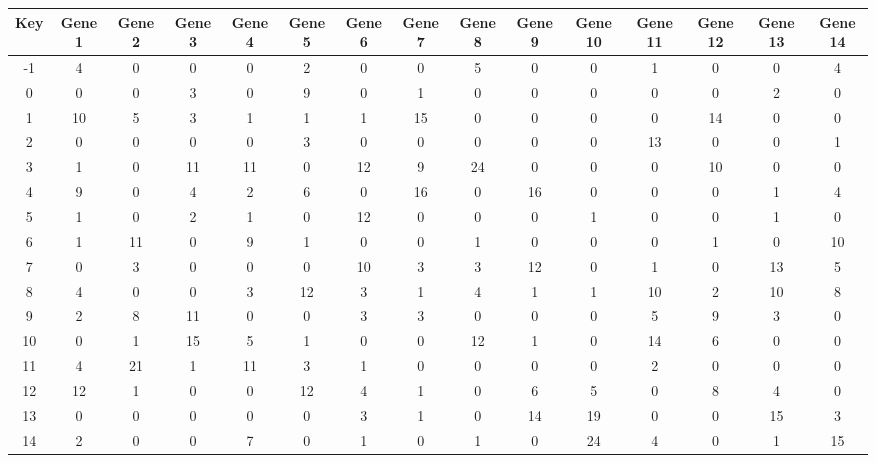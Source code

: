 \begin{tabular}{|c|c|c|c|c|c|c|c|c|c|c|c|c|c|c|}
\hline
Key & Gene 1 & Gene 2 & Gene 3 & Gene 4 & Gene 5 & Gene 6 & Gene 7 & Gene 8 & Gene 9 & Gene 10 & Gene 11 & Gene 12 & Gene 13 & Gene 14 \\
\hline
-1 & 4 & 0 & 0 & 0 & 2 & 0 & 0 & 5 & 0 & 0 & 1 & 0 & 0 & 4 \\
0 & 0 & 0 & 3 & 0 & 9 & 0 & 1 & 0 & 0 & 0 & 0 & 0 & 2 & 0 \\
1 & 10 & 5 & 3 & 1 & 1 & 1 & 15 & 0 & 0 & 0 & 0 & 14 & 0 & 0 \\
2 & 0 & 0 & 0 & 0 & 3 & 0 & 0 & 0 & 0 & 0 & 13 & 0 & 0 & 1 \\
3 & 1 & 0 & 11 & 11 & 0 & 12 & 9 & 24 & 0 & 0 & 0 & 10 & 0 & 0 \\
4 & 9 & 0 & 4 & 2 & 6 & 0 & 16 & 0 & 16 & 0 & 0 & 0 & 1 & 4 \\
5 & 1 & 0 & 2 & 1 & 0 & 12 & 0 & 0 & 0 & 1 & 0 & 0 & 1 & 0 \\
6 & 1 & 11 & 0 & 9 & 1 & 0 & 0 & 1 & 0 & 0 & 0 & 1 & 0 & 10 \\
7 & 0 & 3 & 0 & 0 & 0 & 10 & 3 & 3 & 12 & 0 & 1 & 0 & 13 & 5 \\
8 & 4 & 0 & 0 & 3 & 12 & 3 & 1 & 4 & 1 & 1 & 10 & 2 & 10 & 8 \\
9 & 2 & 8 & 11 & 0 & 0 & 3 & 3 & 0 & 0 & 0 & 5 & 9 & 3 & 0 \\
10 & 0 & 1 & 15 & 5 & 1 & 0 & 0 & 12 & 1 & 0 & 14 & 6 & 0 & 0 \\
11 & 4 & 21 & 1 & 11 & 3 & 1 & 0 & 0 & 0 & 0 & 2 & 0 & 0 & 0 \\
12 & 12 & 1 & 0 & 0 & 12 & 4 & 1 & 0 & 6 & 5 & 0 & 8 & 4 & 0 \\
13 & 0 & 0 & 0 & 0 & 0 & 3 & 1 & 0 & 14 & 19 & 0 & 0 & 15 & 3 \\
14 & 2 & 0 & 0 & 7 & 0 & 1 & 0 & 1 & 0 & 24 & 4 & 0 & 1 & 15 \\
\hline
\end{tabular}